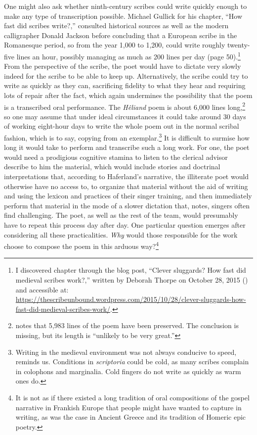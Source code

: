 One might also ask whether ninth-century scribes could write quickly enough to make any type of transcription possible. Michael Gullick for his chapter, “How fast did scribes write?,” consulted historical sources as well as the modern calligrapher Donald Jackson before concluding that a European scribe in the Romanesque period, so from the year 1,000 to 1,200, could write roughly twenty-five lines an hour, possibly managing as much as 200 lines per day (page 50).\footnote{\textrm{I discovered  chapter through the blog post, “Clever sluggards? How fast did medieval scribes work?,” written by Deborah Thorpe on October 28, 2015 (\citealt{Thorpe2015}) and accessible at:} \url{https://thescribeunbound.wordpress.com/2015/10/28/clever-sluggards-how-fast-did-medieval-scribes-work/}. } From the perspective of the scribe, the poet would have to dictate very slowly indeed for the scribe to be able to keep up. Alternatively, the scribe could try to write as quickly as they can, sacrificing fidelity to what they hear and requiring lots of repair after the fact, which again undermines the possibility that the poem is a transcribed oral performance. The \textit{Hêliand} poem is about 6,000 lines long,\footnote{\textrm{\citet[168]{Bostock1976} notes that 5,983 lines of the poem have been preserved. The conclusion is missing, but its length is “unlikely to be very great.”} } so one may assume that under ideal circumstances it could take around 30 days of working eight-hour days to write the whole poem out in the normal scribal fashion, which is to say, copying from an exemplar.\footnote{\textrm{Writing in the medieval environment was not always conducive to speed, \citet[43]{Gullick1995} reminds us. Conditions in} \textrm{\textit{scriptoria}} \textrm{could be cold, as many scribes complain in colophons and marginalia. Cold fingers do not write as quickly as warm ones do.} } It is difficult to surmise how long it would take to perform and transcribe such a long work. For one, the poet would need a prodigious cognitive stamina to listen to the clerical advisor describe to him the material, which would include stories and doctrinal interpretations that, according to Haferland’s narrative, the illiterate poet would otherwise have no access to, to organize that material without the aid of writing and using the lexicon and practices of their singer training, and then immediately perform that material in the mode of a slower dictation that, \citet[114--117]{Ready2019} notes, singers often find challenging. The poet, as well as the rest of the team, would presumably have to repeat this process day after day. One particular question emerges after considering all these practicalities. \textit{Why} would those responsible for the work choose to compose the poem in this arduous way?\footnote{\textrm{It is not as if there existed a long tradition of oral compositions of the gospel narrative in Frankish Europe that people might have wanted to capture in writing, as was the case in Ancient Greece and its tradition of Homeric epic poetry.} }

